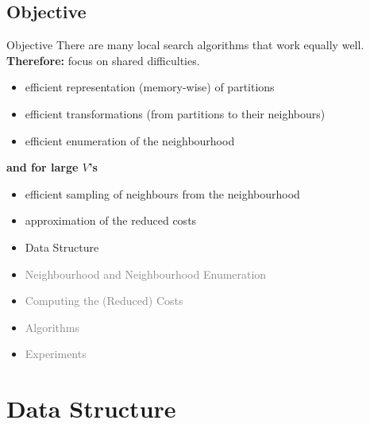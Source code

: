 \documentclass[10pt]{beamer}
\begin{document}
\subsection*{Objective}
\begin{frame}{Objective}
    There are many local search algorithms that work equally well.
    \textbf{Therefore:} focus on shared difficulties.
    \begin{itemize}
        \item efficient representation (memory-wise) of partitions
        \item efficient transformations (from partitions to their neighbours)
        \item efficient enumeration of the neighbourhood
    \end{itemize}
    \textbf{and for large $V$'s}
    \begin{itemize}
        \item efficient sampling of neighbours from the neighbourhood
        \item approximation of the reduced costs
    \end{itemize}
\end{frame}

\begin{frame}
    \begin{itemize}
        \item Data Structure
        \item \textcolor{gray}{Neighbourhood and Neighbourhood Enumeration}
        \item \textcolor{gray}{Computing the (Reduced) Costs}
        \item \textcolor{gray}{Algorithms}
        \item \textcolor{gray}{Experiments}
    \end{itemize}
\end{frame}

\section{Data Structure}
\end{document}
